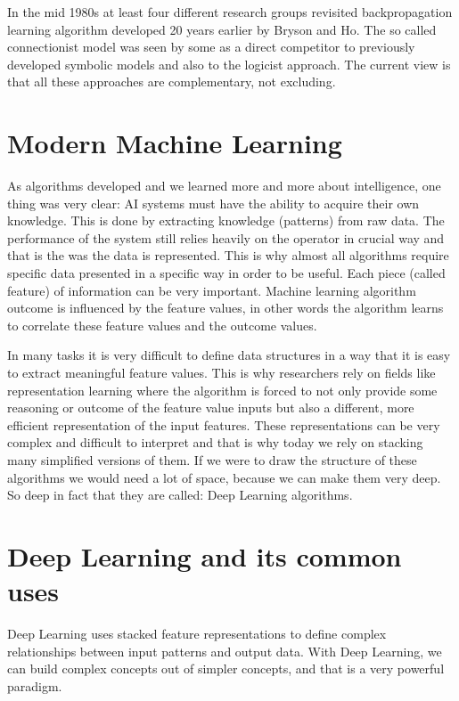 \documentclass[b5paper]{book}
\begin{document}
In the mid 1980s at least four different research groups revisited backpropagation learning algorithm developed 20 years earlier by Bryson and Ho. The so called connectionist model was seen by some as a direct competitor to previously developed symbolic models and also to the logicist approach. The current view is that all these approaches are complementary, not excluding.

\section{Modern Machine Learning}

As algorithms developed and we learned more and more about intelligence, one thing was very clear: AI systems must have the ability to acquire their own knowledge. This is done by extracting knowledge (patterns) from raw data. The performance of the system still relies heavily on the operator in crucial way and that is the was the data is represented. This is why almost all algorithms require specific data presented in a specific way in order to be useful. Each piece (called feature) of information can be very important. Machine learning algorithm outcome is influenced by the feature values, in other words the algorithm learns to correlate these feature values and the outcome values.

In many tasks it is very difficult to define data structures in a way that it is easy to extract meaningful feature values. This is why researchers rely on fields like representation learning where the algorithm is forced to not only provide some reasoning or outcome of the feature value inputs but also a different, more efficient representation of the input features. These representations can be very complex and difficult to interpret and that is why today we rely on stacking many simplified versions of them. If we were to draw the structure of these algorithms we would need a lot of space, because we can make them very deep. So deep in fact that they are called: Deep Learning algorithms.

\section{Deep Learning and its common uses}

Deep Learning uses stacked feature representations to define complex relationships between input patterns and output data. With Deep Learning, we can build complex concepts out of simpler concepts, and that is a very powerful paradigm. 
\end{document}
